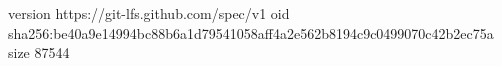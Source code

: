 version https://git-lfs.github.com/spec/v1
oid sha256:be40a9e14994bc88b6a1d79541058aff4a2e562b8194c9c0499070c42b2ec75a
size 87544
